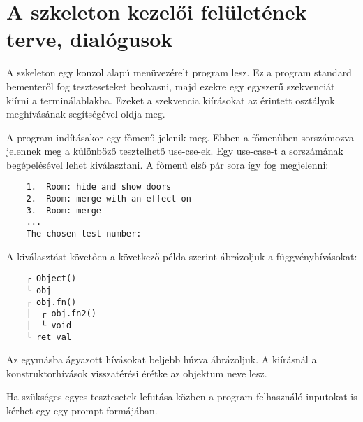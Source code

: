\section{A szkeleton kezelői felületének terve, dialógusok}

A szkeleton egy konzol alapú menüvezérelt program lesz. Ez a program standard bementeről fog teszteseteket beolvasni, majd ezekre egy egyszerű szekvenciát kiírni a terminálablakba. Ezeket a szekvencia kiírásokat az érintett osztályok meghívásának segítségével oldja meg.

A program indításakor egy főmenű jelenik meg. Ebben a főmenűben sorszámozva jelennek meg a különböző tesztelhető use-cse-ek. Egy use-case-t a sorszámának begépelésével lehet kiválasztani. A főmenű első pár sora így fog megjelenni:
\space

\begin{verbatim}
    1.  Room: hide and show doors
    2.  Room: merge with an effect on
    3.  Room: merge
    ...
    The chosen test number: 
\end{verbatim}
\space

A kiválasztást követően a következő példa szerint ábrázoljuk a függvényhívásokat:

 
\begin{verbatim}
    ┌ Object()
    └ obj
    ┌ obj.fn()
    │  ┌ obj.fn2()
    │  └ void
    └ ret_val
\end{verbatim}

Az egymásba ágyazott hívásokat beljebb húzva ábrázoljuk. A kiírásnál a konstruktorhívások visszatérési érétke az objektum neve lesz. 

Ha szükséges egyes tesztesetek lefutása közben a program felhasználó inputokat is kérhet egy-egy prompt formájában.
\clearpage

